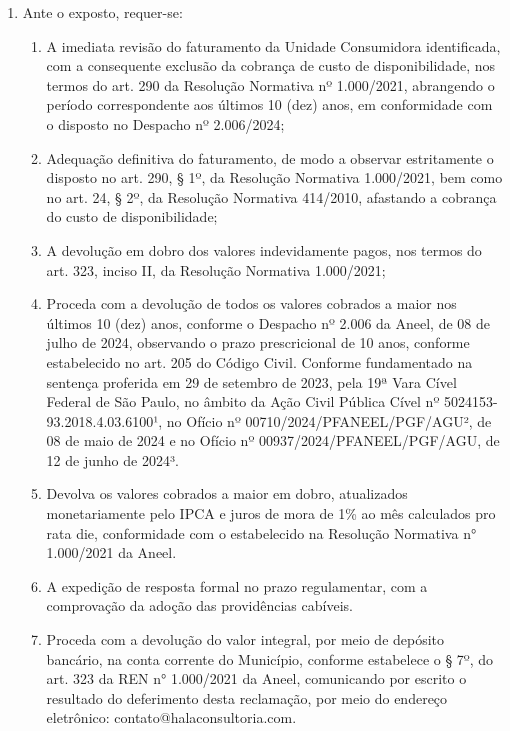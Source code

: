 \begin{enumerate}[resume]
\item Ante o exposto, requer-se:
    \begin{enumerate}
    \item A imediata revisão do faturamento da Unidade Consumidora identificada, com a consequente exclusão da cobrança de custo de disponibilidade, nos termos do art. 290 da Resolução Normativa nº 1.000/2021, abrangendo o período correspondente aos últimos 10 (dez) anos, em conformidade com o disposto no Despacho nº 2.006/2024;
    \item Adequação definitiva do faturamento, de modo a observar estritamente o disposto no art. 290, § 1º, da Resolução Normativa 1.000/2021, bem como no art. 24, § 2º, da Resolução Normativa 414/2010, afastando a cobrança do custo de disponibilidade;
    \item A devolução em dobro dos valores indevidamente pagos, nos termos do art. 323, inciso II, da Resolução Normativa 1.000/2021;
    \item Proceda com a devolução de todos os valores cobrados a maior nos últimos 10 (dez) anos, conforme o Despacho nº 2.006 da Aneel, de 08 de julho de 2024, observando o prazo prescricional de 10 anos, conforme estabelecido no art. 205 do Código Civil. Conforme fundamentado na sentença proferida em 29 de setembro de 2023, pela 19ª Vara Cível Federal de São Paulo, no âmbito da Ação Civil Pública Cível nº 5024153- 93.2018.4.03.6100¹, no Ofício nº 00710/2024/PFANEEL/PGF/AGU², de 08 de maio de 2024 e no Ofício nº 00937/2024/PFANEEL/PGF/AGU, de 12 de junho de 2024³.
    \item Devolva os valores cobrados a maior em dobro, atualizados monetariamente pelo IPCA e juros de mora de 1\% ao mês calculados pro rata die, conformidade com o estabelecido na Resolução Normativa n° 1.000/2021 da Aneel.
    \item A expedição de resposta formal no prazo regulamentar, com a comprovação da adoção das providências cabíveis.
    \item Proceda com a devolução do valor integral, por meio de depósito bancário, na conta corrente do Município, conforme estabelece o § 7º, do art. 323 da REN n° 1.000/2021 da Aneel, comunicando por escrito o resultado do deferimento desta reclamação, por meio do endereço eletrônico: contato@halaconsultoria.com.
    \end{enumerate}
\end{enumerate}